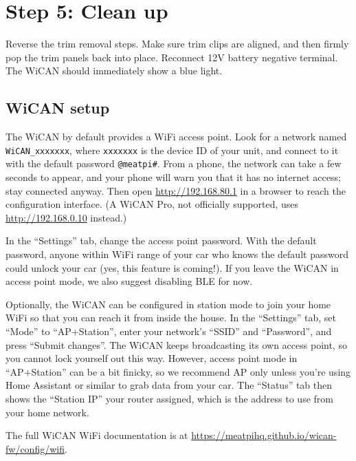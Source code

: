 \documentclass[superscriptaddress,onecolumn,floatfix]{revtex4-2}
\begin{document}
\section{Step 5: Clean up} \label{sect:5}
Reverse the trim removal steps. Make sure trim clips are aligned, and then firmly pop the trim panels back into place. Reconnect 12V battery negative terminal. The WiCAN should immediately show a blue light.

\subsection{WiCAN setup}
The WiCAN by default provides a WiFi access point. Look for a network named \texttt{WiCAN\_xxxxxxx}, where \texttt{xxxxxxx} is the device ID of your unit, and connect to it with the default password \texttt{@meatpi\#}. From a phone, the network can take a few seconds to appear, and your phone will warn you that it has no internet access; stay connected anyway. Then open \href{http://192.168.80.1}{http://192.168.80.1} in a browser to reach the configuration interface. (A WiCAN Pro, not officially supported, uses \href{http://192.168.0.10}{http://192.168.0.10} instead.)

In the ``Settings'' tab, change the access point password. With the default password, anyone within WiFi range of your car who knows the default password could unlock your car (yes, this feature is coming!). If you leave the WiCAN in access point mode, we also suggest disabling BLE for now.

Optionally, the WiCAN can be configured in station mode to join your home WiFi so that you can reach it from inside the house. In the ``Settings'' tab, set ``Mode'' to ``AP+Station'', enter your network's ``SSID'' and ``Password'', and press ``Submit changes''. The WiCAN keeps broadcasting its own access point, so you cannot lock yourself out this way. However, access point mode in ``AP+Station'' can be a bit finicky, so we recommend AP only unless you're using Home Assistant or similar to grab data from your car. The ``Status'' tab then shows the ``Station IP'' your router assigned, which is the address to use from your home network.

The full WiCAN WiFi documentation is at \href{https://meatpihq.github.io/wican-fw/config/wifi}{https://meatpihq.github.io/wican-fw/config/wifi}.
\end{document}
